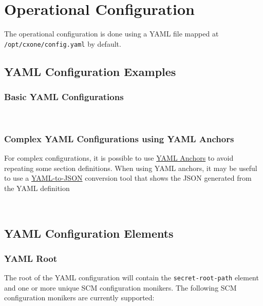 \newpage

\section{Operational Configuration}\label{sec:op-config}

The operational configuration is done using a YAML file mapped at \texttt{/opt/cxone/config.yaml}
by default.  

\subsection{YAML Configuration Examples}

\subsubsection{Basic YAML Configurations}



\newpage
\noindent\\


\subsubsection{Complex YAML Configurations using YAML Anchors}

For complex configurations, it is possible to use 
\href{https://docs.docker.com/compose/compose-file/10-fragments/}{YAML Anchors}
to avoid repeating some section definitions.  When using YAML anchors, it may be useful
to use a \href{https://onlineyamltools.com/convert-yaml-to-json}{YAML-to-JSON} conversion tool that shows the JSON generated from the YAML
definition

\noindent\\

\subsection{YAML Configuration Elements}

\subsubsection{YAML Root}\label{sec:yaml-root}

The root of the YAML configuration will contain the \texttt{secret-root-path} element
and one or more unique SCM configuration monikers.  The following SCM configuration monikers
are currently supported:

